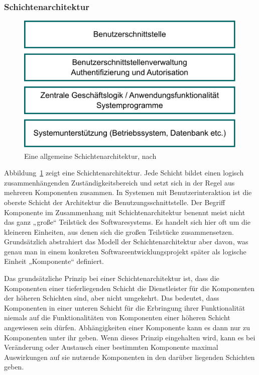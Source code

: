 \subsubsection{Schichtenarchitektur}
\label{sec:Kap-7.1.2.1}

\vspace{\baselineskip} %

\begin{figure}[h!]
	\centering
	\includegraphics{Bilder/Kapitel-7/schichtenarchitektur_allgemein.pdf}
	\caption[Eine allgemeine Schichtenarchitektur]{Eine allgemeine Schichtenarchitektur, nach \cite[204]{som18}}
	\label{fig:schichtenarchitektur_allgemein}
\end{figure}

\vspace{\baselineskip} %

Abbildung~\ref{fig:schichtenarchitektur_allgemein} zeigt eine Schichtenarchitektur. Jede Schicht bildet einen logisch zusammenhängenden Zuständigkeitsbereich und setzt sich in der Regel aus mehreren Komponenten zusammen. In Systemen mit Benutzerinteraktion ist die oberste Schicht der Architektur die Benutzungsschnittstelle. Der Begriff Komponente im Zusammenhang mit Schichtenarchitektur benennt meist nicht das ganz „große“ Teilstück des Softwaresystems. Es handelt sich hier oft um die kleineren Einheiten, aus denen sich die großen Teilstücke zusammensetzen. Grundsätzlich abstrahiert das Modell der Schichtenarchitektur aber davon, was genau man in einem konkreten Softwareentwicklungsprojekt später als logische Einheit „Komponente“ 
\linebreak %
definiert.

Das grundsätzliche Prinzip bei einer Schichtenarchitektur ist, dass die Komponenten einer tieferliegenden Schicht die Dienstleister für die Komponenten der höheren Schichten sind, aber nicht umgekehrt. Das bedeutet, dass Komponenten in einer unteren Schicht für die Erbringung ihrer Funktionalität niemals auf die Funktionali\-täten von Komponenten einer höheren Schicht angewiesen sein dürfen. Abhängigkeiten einer Komponente kann es dann nur zu Komponenten unter ihr geben. Wenn dieses Prinzip eingehalten wird, kann es bei Veränderung oder Austausch einer bestimmten Komponente maximal Auswirkungen auf sie nutzende Komponenten in den darüber liegenden Schichten geben.

